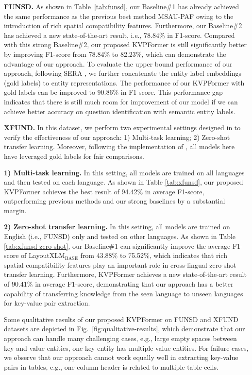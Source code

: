 \documentclass[letterpaper]{article} %
\def \Ours {KVPFormer}
\begin{document}
\textbf{FUNSD.} 
As shown in Table~\ref{tab:funsd}, our Baseline\#1 has already achieved the same performance as the previous best method MSAU-PAF owing to the introduction of rich spatial compatibility features. Furthermore, our Baseline\#2 has achieved a new state-of-the-art result, i.e., 78.84\% in F1-score. Compared with this strong Baseline\#2, our proposed \Ours{} is still significantly better by improving F1-score from 78.84\% to 82.23\%, which can demonstrate the advantage of our approach. To evaluate the upper bound performance of our approach, following SERA \cite{zhang2021entity}, we further concatenate the entity label embeddings (gold labels) to entity representations. The performance of our \Ours{} with gold labels can be improved to 90.86\% in F1-score. This performance gap indicates that there is still much room for improvement of our model if we can achieve better accuracy on question identification with semantic entity labels.

\textbf{XFUND.} In this dataset, we perform two experimental settings designed in \cite{xu2021layoutxlm} to verify the effectiveness of our approach: 1) Multi-task learning; 2) Zero-shot transfer learning. Moreover, following the implementation of \cite{xu2021layoutxlm}, all models here have leveraged gold labels for fair comparisons.

\textbf{1) Multi-task learning.} In this setting, all models are trained on all languages and then tested on each language. As shown in Table \ref{tab:xfunsd}, our proposed \Ours{} achieves the best result of 94.42\% in average F1-score, outperforming previous methods and our strong baselines by a substantial margin.

\textbf{2) Zero-shot transfer learning.} In this setting, all models are trained on English (i.e., FUNSD) only and tested on other languages. As shown in Table \ref{tab:xfunsd-zero-shot}, our Baseline\#1 can significantly improve the average F1-score of LayoutXLM$_{\mathrm{BASE}}$ from 43.88\% to 75.52\%, which indicates that rich spatial compatibility features play an important role in cross-lingual zero-shot transfer learning. Furthermore, \Ours{} achieves a new state-of-the-art result of 90.41\% in average F1-score, demonstrating that our approach has a better capability of transferring knowledge from the seen language to unseen languages for key-value pair extraction.


Some qualitative results of our proposed KVPFormer on FUNSD and XFUND datasets are depicted in Fig.~\ref{fig:qualitative-results}, which demonstrate that our approach can handle many challenging cases, e.g., large empty spaces between key and value entities, one key entity has multiple value entities. For failure cases, we observe that our approach cannot work equally well in extracting key-value pairs in tables, e.g., one column header is related to multiple table cells.
\end{document}
